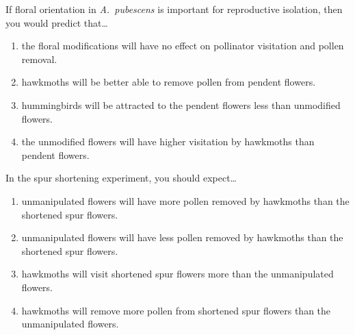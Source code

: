 \documentclass[t,hidelinks]{beamer}
\newcommand{\ques}[1]{\highlight{\textsc{q#1:}}}
\begin{document}
%
\begin{frame}[t]{\ques4 If floral orientation in \textit{A.~pubescens} is important for reproductive isolation, then you would predict that\dots}
	
	
	\begin{enumerate}
		\item the floral modifications will have no effect on pollinator visitation and pollen removal.
		\item hawkmoths will be better able to remove pollen from pendent flowers.
		\item hummingbirds will be attracted to the pendent flowers less than unmodified flowers.
		\item \alert<2>{the unmodified flowers will have higher visitation by hawkmoths than pendent flowers.}
	\end{enumerate}
\end{frame}
%
\begin{frame}[t]{\ques{5} In the spur shortening experiment, you should expect\dots}
	\begin{enumerate}
		\item \alert<2>{unmanipulated flowers will have more pollen removed by hawkmoths than the shortened spur flowers.}
		\item unmanipulated  flowers will have less pollen removed by hawkmoths than the shortened spur flowers.
		\item hawkmoths will visit shortened spur flowers more than the unmanipulated flowers.
		\item hawkmoths will remove more pollen from shortened spur flowers than the unmanipulated flowers.
	\end{enumerate}

\end{frame}
%
\end{document}
